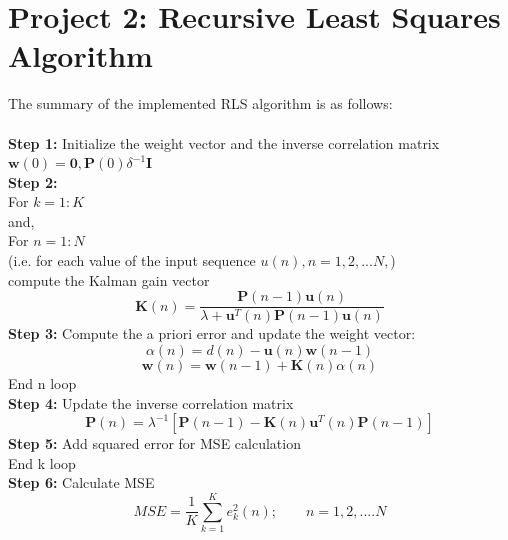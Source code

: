 \documentclass[journal]{IEEEtran}
\begin{document}
\section{Project 2: Recursive Least Squares Algorithm}
The summary of the implemented RLS algorithm is as follows:\\
\\
\textbf{Step 1:} Initialize the weight vector and the inverse correlation matrix
$\boldsymbol{w}(0) = \boldsymbol{0},  \boldsymbol{P}(0) \delta^{-1}\boldsymbol{I}$\\
\textbf{Step 2:}\\
For $k = 1:K$\\
and,\\
For $n = 1:N$\\
(i.e. for each value of the input sequence $u(n), n = 1,2,...N,$)
\\ \indent compute the Kalman gain vector
\begin{equation}
  \boldsymbol{K}(n)= \dfrac{\boldsymbol{P}(n-1)\boldsymbol{u}(n)}{\lambda+\boldsymbol{u}^T(n)\boldsymbol{P}(n-1)\boldsymbol{u}(n)}
\end{equation}
\indent \textbf{Step 3:} Compute the a priori error and update the weight vector:
\begin{equation}
  \alpha(n) = d(n) - \boldsymbol{u}(n)\boldsymbol{w}(n-1)
\end{equation}
\begin{equation}
  \boldsymbol{w}(n)= \boldsymbol{w}(n-1)+\boldsymbol{K}(n)\alpha(n)
\end{equation}
End n loop\\
\indent \textbf{Step 4:} Update the inverse correlation matrix
\begin{equation}
  \boldsymbol{P}(n)= \lambda^{-1}[\boldsymbol{P}(n-1)-\boldsymbol{K}(n)\boldsymbol{u}^T(n)\boldsymbol{P}(n-1)]
\end{equation}
\textbf{Step 5:} Add squared error for MSE calculation\\
End k loop\\
\textbf{Step 6:} Calculate MSE
\begin{equation}
  \label{eq:MSE}
  MSE=\dfrac{1}{K}\sum_{k=1}^{K}e_k^2(n); \qquad n = 1,2,....N
\end{equation}
\end{document}
